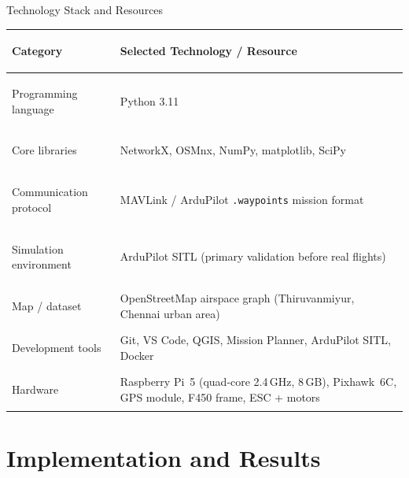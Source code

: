 \documentclass[aspectratio=169,11pt]{beamer}
\begin{document}
\begin{frame}{Technology Stack and Resources}
  \small
  \begin{tabularx}{\textwidth}{>{\bfseries\raggedright\arraybackslash}p{3.2cm}Y}
    \toprule
    Category & Selected Technology / Resource\\
    \midrule
    Programming language  & Python 3.11\\
    Core libraries        & NetworkX, OSMnx, NumPy, matplotlib, SciPy\\
    Communication protocol & MAVLink / ArduPilot \texttt{.waypoints}
                             mission format\\
    Simulation environment & ArduPilot SITL (primary validation before
                             real flights)\\
    Map / dataset          & OpenStreetMap airspace graph
                             (Thiruvanmiyur, Chennai urban area)\\
    Development tools      & Git, VS Code, QGIS, Mission Planner,
                             ArduPilot SITL, Docker\\
    Hardware               & Raspberry Pi~5 (quad-core 2.4\,GHz, 8\,GB),
                             Pixhawk~6C, GPS module, F450 frame,
                             ESC + motors\\
    \bottomrule
  \end{tabularx}
\end{frame}

\section{Implementation and Results}
\end{document}
